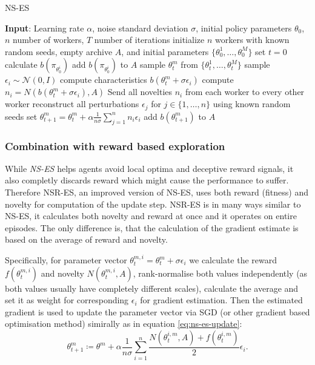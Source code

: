 \begin{algorithm}
    \begin{algorithmic}[1]
    \caption{NS-ES}
    \label{alg:ns-es}
        \State \textbf{Input}: Learning rate $\alpha$, noise standard deviation $\sigma$, initial policy parameters $\theta_0$, $n$ number of workers, $T$ number of iterations
        \State initialize $n$ workers with known random seeds, empty archive $A$, and initial parameters $\{\theta^1_0,\dots, \theta^M_0\}$
        \State set $t=0$
            \State calculate $b(\pi_{\theta^i_0})$
            \State add $b(\pi_{\theta^i_0})$ to $A$
        \EndFor
            \State sample $\theta_t^m$ from $\{\theta^1_t,\dots, \theta^M_t\}$
                \State sample $\epsilon_i \sim \mathcal{N}(0,I)$ 
                \State compute characteristics $b(\theta^m_t+\sigma\epsilon_i)$
                \State compute $n_i = N(b(\theta^m_t+\sigma\epsilon_i), A)$
            \EndFor
            \State Send all novelties $n_i$ from each worker to every other worker
                \State reconstruct all perturbations $\epsilon_j $ for $j \in \{1,\dots,n\}$ using known random seeds
                \State set $\theta^m_{t+1} = \theta_t^m + \alpha \frac{1}{n\sigma}\sum_{j=1}^nn_i\epsilon_i$
                \State add $b(\theta^m_{t+1})$ to $A$
            \EndFor
        \EndFor
    \end{algorithmic}
\end{algorithm}


\subsubsection{Combination with reward based exploration}
While \emph{NS-ES} helps agents avoid local optima and deceptive reward signals, it also completly discards reward which might cause the performance to suffer. Therefore NSR-ES, an improved version of NS-ES, uses both reward (fitness) and novelty for computation of the update step. NSR-ES is in many ways similar to NS-ES, it calculates both novelty and reward at once and it operates on entire episodes. The only difference is, that the calculation of the gradient estimate is based on the average of reward and novelty. 

Specifically, for parameter vector $\theta_t^{m,i} = \theta_t^m+\sigma\epsilon_i$ we calculate the reward $f(\theta_t^{m,i})$ and novelty $N(\theta_t^{m,i},A)$, rank-normalise both values independently (as both values usually have completely different scales), calculate the average and set it as weight for corresponding $\epsilon_i$ for gradient estimation. Then the estimated gradient is used to update the parameter vector via SGD (or other gradient based optimisation method) simirally as in equation \ref{eq:ns-es-update}:
\begin{equation}
    \theta^m_{t+1}\coloneqq\theta^m + \alpha \frac{1}{n\sigma}\sum_{i=1}^n \dfrac{N(\theta_t^{i,m},A)+f(\theta_t^{i,m})}{2}\epsilon_i.
\end{equation}

